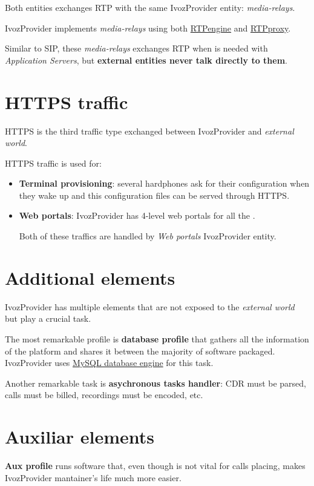 \documentclass[letterpaper,10pt,english]{sphinxmanual}
\begin{document}
Both entities exchanges RTP with the same IvozProvider entity: \emph{media-relays}.

IvozProvider implements \emph{media-relays} using both \href{https://github.com/sipwise/rtpengine}{RTPengine} and
\href{http://www.rtpproxy.org/}{RTPproxy}.

Similar to SIP, these \emph{media-relays} exchanges RTP when is needed with
\emph{Application Servers}, but \textbf{external entities never talk directly to them}.


\section{HTTPS traffic}
\label{architecture/index:https-traffic}
HTTPS is the third traffic type exchanged between IvozProvider and \emph{external
world}.

HTTPS traffic is used for:
\begin{itemize}
\item {} 
\textbf{Terminal provisioning}: several hardphones ask for their configuration when
they wake up and this configuration files can be served through HTTPS.

\item {} 
\textbf{Web portals}: IvozProvider has 4-level web portals for all the
{\hyperref[operation_roles/index:operation\string-roles]{}}.

Both of these traffics are handled by \emph{Web portals} IvozProvider entity.

\end{itemize}


\section{Additional elements}
\label{architecture/index:additional-elements}
IvozProvider has multiple elements that are not exposed to the \emph{external world}
but play a crucial task.

The most remarkable profile is \textbf{database profile} that gathers all the
information of the platform and shares it between the majority of software packaged.
IvozProvider uses \href{https://www.mysql.com/}{MySQL database engine} for this task.

Another remarkable task is \textbf{asychronous tasks handler}: CDR must be parsed,
calls must be billed, recordings must be encoded, etc.


\section{Auxiliar elements}
\label{architecture/index:auxiliar-elements}
\textbf{Aux profile} runs software that, even though is not vital for calls placing,
makes IvozProvider mantainer's life much more easier.
\end{document}
